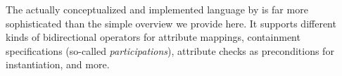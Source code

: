 
The actually conceptualized and implemented language by \textcite{gleitze2017a} is far more sophisticated than the simple overview we provide here. 
It supports different kinds of bidirectional operators for attribute mappings, containment specifications (so-called \emph{participations}), attribute checks as preconditions for \commonality instantiation, and more.


